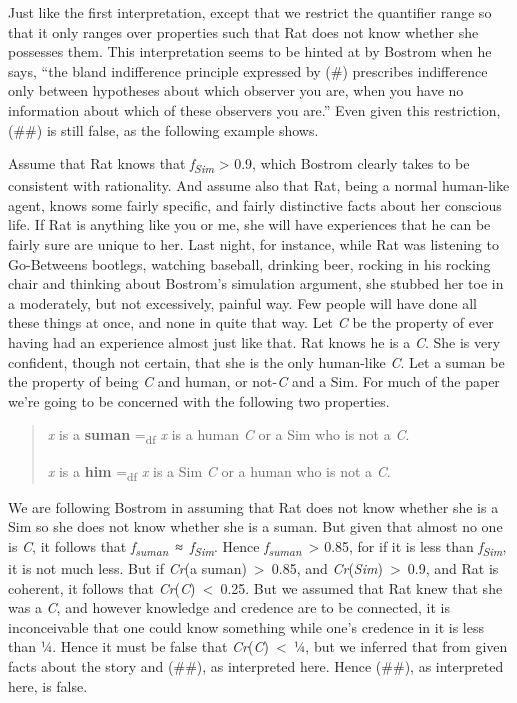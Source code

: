\documentclass[
  11pt,
  letterpaper,
  DIV=11,
  numbers=noendperiod,
  twoside]{scrartcl}
\newcounter{none} %
\begin{document}
Just like the first interpretation, except that we restrict the
quantifier range so that it only ranges over properties such that Rat
does not know whether she possesses them. This interpretation seems to
be hinted at by Bostrom when he says, ``the bland indifference principle
expressed by (\#) prescribes indifference only between hypotheses about
which observer you are, when you have no information about which of
these observers you are.'' Even given this restriction, (\#\#) is still
false, as the following example shows.

Assume that Rat knows that \emph{f\textsubscript{Sim}} \textgreater{}
0.9, which Bostrom clearly takes to be consistent with rationality. And
assume also that Rat, being a normal human-like agent, knows some fairly
specific, and fairly distinctive facts about her conscious life. If Rat
is anything like you or me, she will have experiences that he can be
fairly sure are unique to her. Last night, for instance, while Rat was
listening to Go-Betweens bootlegs, watching baseball, drinking beer,
rocking in his rocking chair and thinking about Bostrom's simulation
argument, she stubbed her toe in a moderately, but not excessively,
painful way. Few people will have done all these things at once, and
none in quite that way. Let \emph{C} be the property of ever having had
an experience almost just like that. Rat knows he is a \emph{C}. She is
very confident, though not certain, that she is the only human-like
\emph{C}. Let a suman be the property of being \emph{C} and human, or
not-\emph{C} and a Sim. For much of the paper we're going to be
concerned with the following two properties.

\begin{quote}
\emph{x} is a \textbf{suman} =\textsubscript{df} \emph{x} is a human
\emph{C} or a Sim who is not a \emph{C}.

\emph{x} is a \textbf{him} =\textsubscript{df} \emph{x} is a Sim
\emph{C} or a human who is not a \emph{C}.
\end{quote}

We are following Bostrom in assuming that Rat does not know whether she
is a Sim so she does not know whether she is a suman. But given that
almost no one is \emph{C}, it follows that
\emph{f\textsubscript{suman}}~≈~\emph{f\textsubscript{Sim}}. Hence
\emph{f\textsubscript{suman}}~\textgreater{} 0.85, for if it is less
than \emph{f\textsubscript{Sim}}, it is not much less. But if
\emph{Cr}(a suman)~\textgreater~0.85, and
\emph{Cr}(\emph{Sim})~\textgreater~0.9, and Rat is coherent, it follows
that \emph{Cr}(\emph{C})~\textless~0.25. But we assumed that Rat knew
that she was a \emph{C}, and however knowledge and credence are to be
connected, it is inconceivable that one could know something while one's
credence in it is less than ¼. Hence it must be false that
\emph{Cr}(\emph{C})~\textless~¼, but we inferred that from given facts
about the story and (\#\#), as interpreted here. Hence (\#\#), as
interpreted here, is false.
\end{document}

